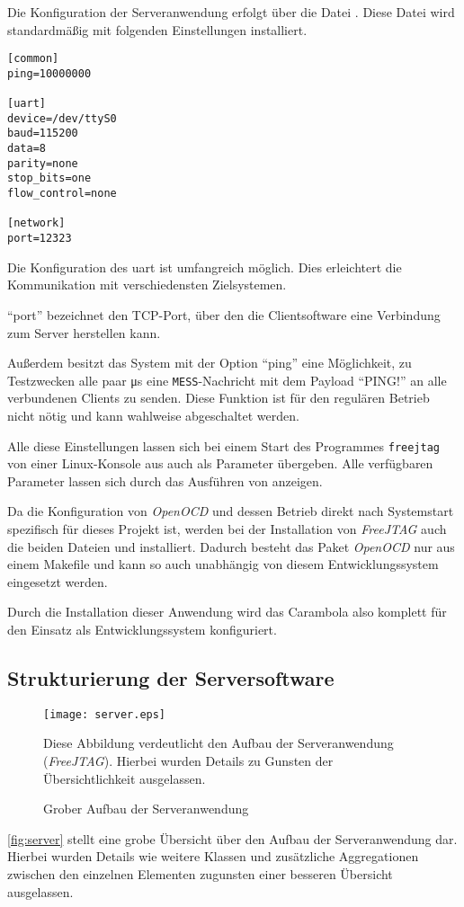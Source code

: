 Die Konfiguration der Serveranwendung erfolgt über die Datei
. Diese Datei wird standardmäßig mit folgenden
Einstellungen installiert.
\begin{lstlisting}
[common]
ping=10000000

[uart]
device=/dev/ttyS0
baud=115200
data=8
parity=none
stop_bits=one
flow_control=none

[network]
port=12323
\end{lstlisting}

Die Konfiguration des \gls{uart} ist umfangreich möglich. Dies erleichtert
die Kommunikation mit verschiedensten Zielsystemen.

"`port"' bezeichnet den TCP-Port, über den die Clientsoftware eine
Verbindung zum Server herstellen kann.

Außerdem besitzt das System mit der Option "`ping"' eine Möglichkeit, zu
Testzwecken alle paar \si{\us} eine \texttt{MESS}-Nachricht mit dem Payload
"`PING!"' an alle verbundenen Clients zu senden. Diese Funktion ist für den
regulären Betrieb nicht nötig und kann wahlweise abgeschaltet werden.

Alle diese Einstellungen lassen sich bei einem Start des Programmes
\texttt{freejtag} von einer Linux-Konsole aus auch als Parameter
übergeben. Alle verfügbaren Parameter lassen sich durch das Ausführen von
 anzeigen.

Da die Konfiguration von \emph{OpenOCD} und dessen Betrieb direkt nach
Systemstart spezifisch für dieses Projekt ist, werden bei der Installation von
\emph{FreeJTAG} auch die beiden Dateien  und
 installiert. Dadurch besteht das Paket
\emph{OpenOCD} nur aus einem Makefile und kann so auch unabhängig von diesem
Entwicklungssystem eingesetzt werden.

Durch die Installation dieser Anwendung wird das Carambola also komplett für den
Einsatz als Entwicklungssystem konfiguriert.

\subsection{Strukturierung der Serversoftware}
\begin{figure}[!ht]
\centering
\texttt{[image: server.eps]}
\caption{Grober Aufbau der Serveranwendung}{Diese Abbildung verdeutlicht den
Aufbau der Serveranwendung (\emph{FreeJTAG}). Hierbei wurden Details zu Gunsten der
Übersichtlichkeit ausgelassen.}
\label{fig:server}
\end{figure}
\autoref{fig:server} stellt eine grobe Übersicht über den Aufbau der
Serveranwendung dar. Hierbei wurden Details wie weitere Klassen und
zusätzliche Aggregationen zwischen den einzelnen Elementen zugunsten einer
besseren Übersicht ausgelassen.


